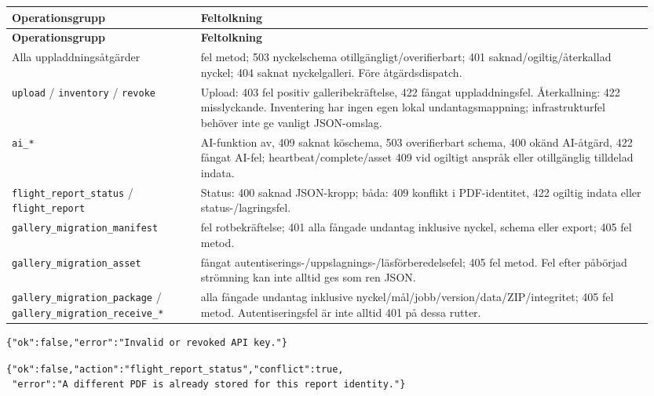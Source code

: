 \documentclass[11pt,a4paper]{article}
\newcommand{\codeword}[1]{\nolinkurl{#1}}
\begin{document}
\begin{longtable}{@{}>{\RaggedRight\arraybackslash}p{0.28\linewidth}>{\RaggedRight\arraybackslash}p{0.67\linewidth}@{}}
\toprule
\textbf{Operationsgrupp} & \textbf{Feltolkning} \\
\midrule
\endfirsthead
\toprule
\textbf{Operationsgrupp} & \textbf{Feltolkning} \\
\midrule
\endhead
\bottomrule
\endfoot
Alla uppladdningsåtgärder & 405 fel metod; 503 nyckelschema otillgängligt/overifierbart; 401
saknad/ogiltig/återkallad nyckel; 404 saknat nyckelgalleri. Före åtgärdsdispatch. \\
\codeword{upload} / \codeword{inventory} / \codeword{revoke} & Upload: 403 fel positiv
galleribekräftelse, 422 fångat uppladdningsfel. Återkallning: 422 misslyckande. Inventering
har ingen egen lokal undantagsmappning; infrastrukturfel behöver inte ge vanligt
JSON-omslag. \\
\codeword{ai_*} & 403 AI-funktion av, 409 saknat köschema, 503 overifierbart schema, 400
okänd AI-åtgärd, 422 fångat AI-fel; heartbeat/complete/asset 409 vid ogiltigt anspråk eller
otillgänglig tilldelad indata. \\
\codeword{flight_report_status} / \codeword{flight_report} & Status: 400 saknad JSON-kropp;
båda: 409 konflikt i PDF-identitet, 422 ogiltig indata eller status-/lagringsfel. \\
\codeword{gallery_migration_manifest} & 403 fel rotbekräftelse; 401 alla fångade undantag
inklusive nyckel, schema eller export; 405 fel metod. \\
\codeword{gallery_migration_asset} & 404 fångat
autentiserings-/uppslagnings-/läsförberedelsefel; 405 fel metod. Fel efter påbörjad
strömning kan inte alltid ges som ren JSON. \\
\codeword{gallery_migration_package} / \codeword{gallery_migration_receive_*} & 422 alla
fångade undantag inklusive nyckel/mål/jobb/version/data/ZIP/integritet; 405 fel metod.
Autentiseringsfel är inte alltid 401 på dessa rutter. \\
\end{longtable}

\begin{lstlisting}[language={}]
{"ok":false,"error":"Invalid or revoked API key."}
\end{lstlisting}

\begin{lstlisting}[language={}]
{"ok":false,"action":"flight_report_status","conflict":true,
 "error":"A different PDF is already stored for this report identity."}
\end{lstlisting}
\end{document}
